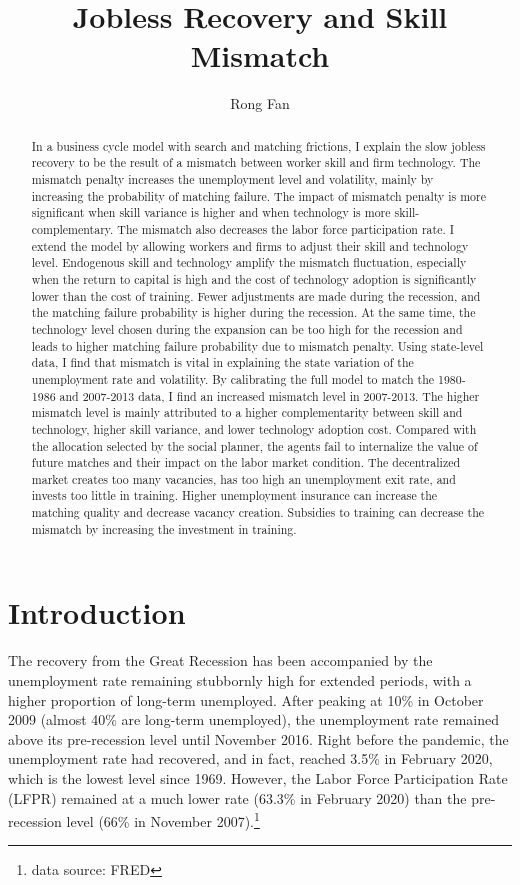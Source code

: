 \documentclass[12pt]{article}
\title{Jobless Recovery and Skill Mismatch}
\date{}
\author{Rong Fan}
\newcommand{\1}{\mathbb{1}}
\begin{document}
\maketitle
\begin{abstract}
In a business cycle model with search and matching frictions, I explain the slow jobless recovery to be the result of a mismatch between worker skill and firm technology. The mismatch penalty increases the unemployment level and volatility, mainly by increasing the probability of matching failure. The impact of mismatch penalty is more significant when skill variance is higher and when technology is more skill-complementary. The mismatch also decreases the labor force participation rate. 
I extend the model by allowing workers and firms to adjust their skill and technology level. Endogenous skill and technology amplify the mismatch fluctuation, especially when the return to capital is high and the cost of technology adoption is significantly lower than the cost of training. Fewer adjustments are made during the recession, and the matching failure probability is higher during the recession. At the same time, the technology level chosen during the expansion can be too high for the recession and leads to higher matching failure probability due to mismatch penalty. 
Using state-level data, I find that mismatch is vital in explaining the state variation of the unemployment rate and volatility. 
By calibrating the full model to match the 1980-1986 and 2007-2013 data, I find an increased mismatch level in 2007-2013. The higher mismatch level is mainly attributed to a higher complementarity between skill and technology, higher skill variance, and lower technology adoption cost. 
Compared with the allocation selected by the social planner, the agents fail to internalize the value of future matches and their impact on the labor market condition. The decentralized market creates too many vacancies, has too high an unemployment exit rate, and invests too little in training. Higher unemployment insurance can increase the matching quality and decrease vacancy creation. Subsidies to training can decrease the mismatch by increasing the investment in training. 

\end{abstract}

\clearpage
\section{Introduction}
The recovery from the Great Recession has been accompanied by the unemployment rate remaining stubbornly high for extended periods, with a higher proportion of long-term unemployed. After peaking at 10\% in October 2009 (almost 40\% are long-term unemployed), the unemployment rate remained above its pre-recession level until November 2016. Right before the pandemic, the unemployment rate had recovered, and in fact, reached 3.5\% in February 2020, which is the lowest level since 1969. However, the Labor Force Participation Rate (LFPR) remained at a much lower rate (63.3\% in February 2020) than the pre-recession level  (66\% in November 2007).\footnote{data source: FRED} \\
\end{document}
